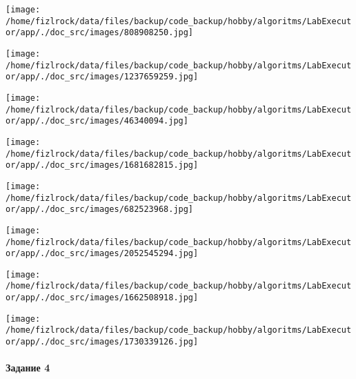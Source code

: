 \documentclass[a4paper, 12pt]{article}
\begin{document}
\texttt{[image: /home/fizlrock/data/files/backup/code\_backup/hobby/algoritms/LabExecutor/app/./doc\_src/images/808908250.jpg]}

\texttt{[image: /home/fizlrock/data/files/backup/code\_backup/hobby/algoritms/LabExecutor/app/./doc\_src/images/1237659259.jpg]}

\texttt{[image: /home/fizlrock/data/files/backup/code\_backup/hobby/algoritms/LabExecutor/app/./doc\_src/images/46340094.jpg]}

\texttt{[image: /home/fizlrock/data/files/backup/code\_backup/hobby/algoritms/LabExecutor/app/./doc\_src/images/1681682815.jpg]}

\texttt{[image: /home/fizlrock/data/files/backup/code\_backup/hobby/algoritms/LabExecutor/app/./doc\_src/images/682523968.jpg]}

\texttt{[image: /home/fizlrock/data/files/backup/code\_backup/hobby/algoritms/LabExecutor/app/./doc\_src/images/2052545294.jpg]}

\texttt{[image: /home/fizlrock/data/files/backup/code\_backup/hobby/algoritms/LabExecutor/app/./doc\_src/images/1662508918.jpg]}

\texttt{[image: /home/fizlrock/data/files/backup/code\_backup/hobby/algoritms/LabExecutor/app/./doc\_src/images/1730339126.jpg]}
\pagebreak
\paragraph{Задание 4}
\end{document}
